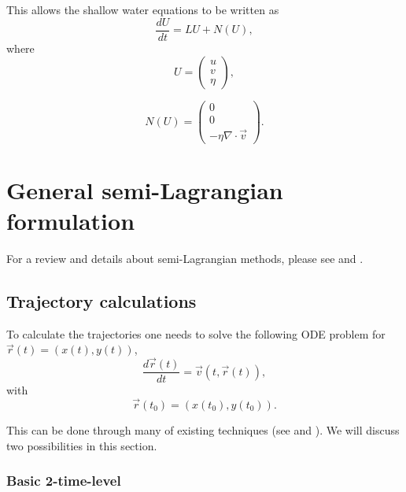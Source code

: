 \documentclass[10pt,a4paper]{article}
\begin{document}
 This allows the shallow water equations to be written as
 \begin{equation}
\frac{dU}{dt}=LU+N(U), 
 \end{equation}
 where 
 \begin{equation}
 U=\left(\begin{array}{c}
  u\\
 v\\
 \eta  
\end{array}\right),
 \end{equation}
 
 \begin{equation}
 N(U)=\left(\begin{array}{c}
  0\\
 0\\
 -\eta \nabla\cdot \vec{v}  
\end{array}\right).
 \end{equation} 


\section{General semi-Lagrangian formulation}

For a review and details about semi-Lagrangian methods, please see \cite{Staniforth1991} and \cite{Durran2010}. 

\subsection{Trajectory calculations}

To calculate the trajectories one needs to solve the following ODE problem for $\vec{r}(t)=(x(t), y(t))$,
\begin{equation}
\frac{d \vec{r}(t)}{dt} = \vec{v}(t, \vec{r}(t)),
\end{equation}
with 
\begin{equation}
\vec{r}(t_0) = (x(t_0), y(t_0)).
\end{equation}

This can be done through many of existing techniques (see \cite{Staniforth1991} and \cite{Durran2010}).  We will discuss two possibilities in this section.

\subsubsection*{Basic 2-time-level}
\end{document}
